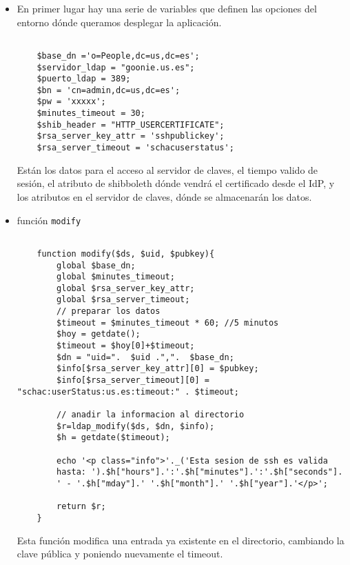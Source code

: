     \begin{itemize}

    \item En primer lugar hay una serie de variables que definen las opciones del
    entorno dónde queramos desplegar la aplicación.

    \begin{lstlisting}

    $base_dn ='o=People,dc=us,dc=es';
    $servidor_ldap = "goonie.us.es";
    $puerto_ldap = 389;
    $bn = 'cn=admin,dc=us,dc=es';
    $pw = 'xxxxx';
    $minutes_timeout = 30;
    $shib_header = "HTTP_USERCERTIFICATE";
    $rsa_server_key_attr = 'sshpublickey';
    $rsa_server_timeout = 'schacuserstatus';

    \end{lstlisting}

    Están los datos para el acceso al servidor de claves, el tiempo valido
    de sesión, el atributo de shibboleth dónde vendrá el certificado desde
    el IdP, y los atributos en el servidor de claves, dónde se almacenarán
    los datos.


    \item función \texttt{modify}
    
    \begin{lstlisting}

    function modify($ds, $uid, $pubkey){
        global $base_dn;
        global $minutes_timeout;
        global $rsa_server_key_attr;
        global $rsa_server_timeout;
        // preparar los datos
        $timeout = $minutes_timeout * 60; //5 minutos
        $hoy = getdate();
        $timeout = $hoy[0]+$timeout;
        $dn = "uid=".  $uid .",".  $base_dn;
        $info[$rsa_server_key_attr][0] = $pubkey;
        $info[$rsa_server_timeout][0] = "schac:userStatus:us.es:timeout:" . $timeout;

        // anadir la informacion al directorio
        $r=ldap_modify($ds, $dn, $info);
        $h = getdate($timeout);
        
        echo '<p class="info">'._('Esta sesion de ssh es valida 
        hasta: ').$h["hours"].':'.$h["minutes"].':'.$h["seconds"].
        ' - '.$h["mday"].' '.$h["month"].' '.$h["year"].'</p>';

        return $r;
    }

    \end{lstlisting}

    Esta función modifica una entrada ya existente en el directorio,
    cambiando la clave pública y poniendo nuevamente el timeout.


\end{itemize}
